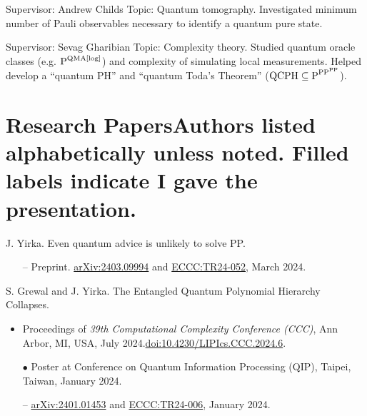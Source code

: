 \documentclass[11pt,letterpaper,serif]{moderncv}
\begin{document}
{}{}{}
{
	\begin{adjustwidth}{.25in}{}
		Supervisor: Andrew Childs \newline
		Topic: Quantum tomography. Investigated minimum number of Pauli observables necessary to identify a quantum pure state.
	\end{adjustwidth}
}

{
	\begin{adjustwidth}{.25in}{}
		Supervisor: Sevag Gharibian \newline
		Topic: Complexity theory. Studied quantum oracle classes  (e.g. {\scriptsize $\textup{P}^{\textup{QMA[log]}}$}) and complexity of simulating local measurements. Helped develop a ``quantum PH'' and ``quantum Toda's Theorem'' ({\scriptsize $\textup{QCPH}\subseteq \textup{P}^{\textup{PP}^{\textup{PP}}}$}).
	\end{adjustwidth}
}


\section{Research Papers\hfill{\footnotesize \normalfont Authors listed alphabetically unless noted. Filled labels indicate I gave the presentation.}}

J. Yirka.\quad
Even quantum advice is unlikely to solve \textup{PP}.
\begin{adjustwidth}{.1in}{}
	\begin{itemize}
		\item[--] Preprint. \href{https://arxiv.org/abs/2403.09994}{arXiv:2403.09994} and \href{https://eccc.weizmann.ac.il/report/2024/052/}{ECCC:TR24-052}, March 2024.
	\end{itemize}
\end{adjustwidth}
\medskip

S. Grewal and J. Yirka.\quad
The Entangled Quantum Polynomial Hierarchy Collapses.
\begin{adjustwidth}{.1in}{}
	\begin{itemize}
		\item Proceedings of \textit{39th Computational Complexity Conference (CCC)}, Ann Arbor, MI, USA, July 2024.\quad \href{https://doi.org/10.4230/LIPIcs.CCC.2024.6}{doi:10.4230/LIPIcs.CCC.2024.6}.
		\item[$\bullet$] Poster at Conference on Quantum Information Processing (QIP), Taipei, Taiwan, January 2024.
		\item[--] \href{https://arxiv.org/abs/2401.01453}{arXiv:2401.01453} and \href{https://eccc.weizmann.ac.il/report/2024/006/}{ECCC:TR24-006}, January 2024.
	\end{itemize}
\end{adjustwidth}
\medskip
\end{document}
